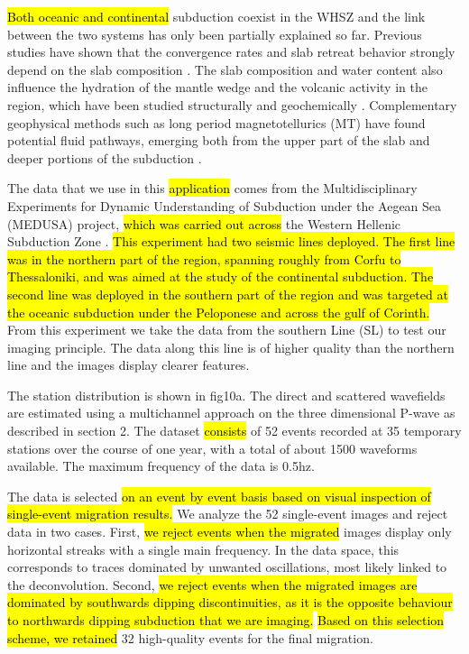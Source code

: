 \documentclass[10pt,a4paper]{article}
\begin{document}
\hl{Both oceanic and continental} subduction coexist in the WHSZ and the link between the two systems has only been partially explained so far.
Previous studies have shown that the convergence rates and slab retreat behavior strongly depend on the slab composition \citep{papa_tecto_07}.
The slab composition and water content also influence the hydration of the mantle wedge and the volcanic activity in the region, which have been studied structurally and geochemically \citep{pepi_gsa_07}.
Complementary geophysical methods such as long period magnetotellurics (MT) have found potential fluid pathways, emerging both from the upper part of the slab and deeper portions of the subduction \citep{gala_tphy_05,tzan_gji_18}.

The data that we use in this \hl{application} comes from the Multidisciplinary Experiments for Dynamic Understanding of Subduction under the Aegean Sea (MEDUSA) project, \hl{which was carried out across} the Western Hellenic Subduction Zone \citep{pear_jgr_12}.
\hl{This experiment had two seismic lines deployed.
The first line was in the northern part of the region, spanning roughly from Corfu to Thessaloniki, and was aimed at the study of the continental subduction.
The second line was deployed in the southern part of the region and was targeted at the oceanic subduction under the Peloponese and across the gulf of Corinth.}
From this experiment we take the data from the southern Line (SL) to test our imaging principle.
The data along this line is of higher quality than the northern line and the images display clearer features. %

The station distribution is shown in fig10a.
The direct and scattered wavefields are estimated using a multichannel approach on the three dimensional P-wave as described in section 2.
The dataset \hl{consists} of 52 events recorded at 35 temporary stations over the course of one year, with a total of about 1500 waveforms available.
The maximum frequency of the data is 0.5hz.

The data is selected \hl{on an event by event basis based on visual inspection of single-event migration results.}
We analyze the 52 single-event images and reject data in two cases.
First, \hl{we reject events when the migrated} images display only horizontal streaks with a single main frequency.
In the data space, this corresponds to traces dominated by unwanted oscillations, most likely linked to the deconvolution.
Second, \hl{we reject events when the migrated images are dominated by southwards dipping discontinuities, as it is the opposite behaviour to northwards dipping subduction that we are imaging.}
\hl{Based on this selection scheme, we retained} 32 high-quality events for the final migration.
\end{document}
